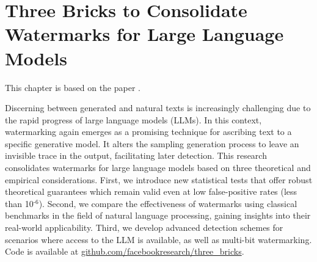 
\chapter{Three Bricks to Consolidate Watermarks for Large Language Models}\label{chapter:three-bricks}

This chapter is based on the paper .

Discerning between generated and natural texts is increasingly challenging due to the rapid progress of large language models (LLMs).
In this context, watermarking again emerges as a promising technique for ascribing text to a specific generative model. 
It alters the sampling generation process to leave an invisible trace in the output, facilitating later detection.
This research consolidates watermarks for large language models based on three theoretical and empirical considerations. 
First, we introduce new statistical tests that offer robust theoretical guarantees which remain valid even at low false-positive rates (less than 10$^{\text{-6}}$). 
Second, we compare the effectiveness of watermarks using classical benchmarks in the field of natural language processing, gaining insights into their real-world applicability.
Third, we develop advanced detection schemes for scenarios where access to the LLM is available, as well as multi-bit watermarking. 
Code is available at \url{github.com/facebookresearch/three_bricks}.

\newpage






